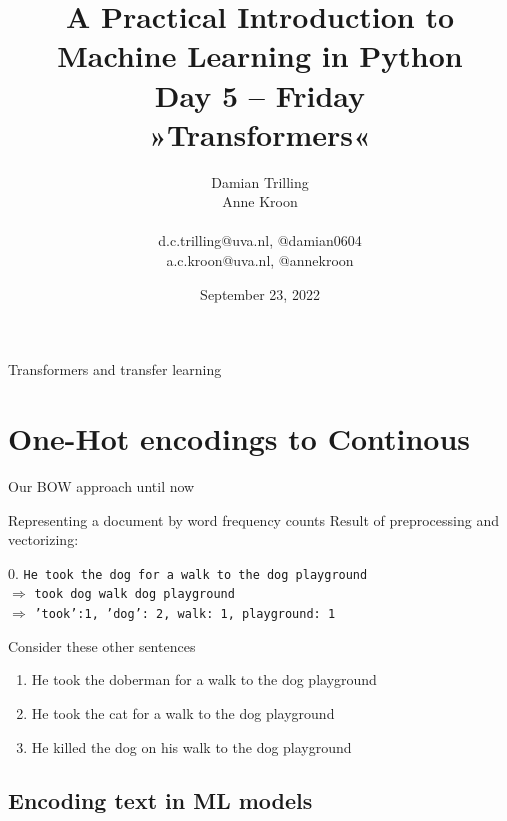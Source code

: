 \documentclass[compress]{beamer}
\title[ML in PYthon]{\textbf{A Practical Introduction to Machine Learning in Python} \\Day 5 -- Friday \\ »Transformers«}
\author[Damian Trilling, Anne Kroon]{Damian Trilling \\ Anne Kroon \\ ~ \\ \footnotesize{d.c.trilling@uva.nl, @damian0604 \\a.c.kroon@uva.nl, @annekroon} \\}
\date{September 23, 2022}
\institute[Gesis]{Gesis}
\begin{document}
\begin{frame}{}
	\titlepage
\end{frame}

\begin{frame}{Transformers and transfer learning}
	\begin{scriptsize}
\tableofcontents
\end{scriptsize}
\end{frame}


\section[One-Hot]{One-Hot encodings to Continous}

\begin{frame}{Our BOW approach until now}
	\begin{block}{Representing a document by word frequency counts}
		Result of preprocessing and vectorizing:
		
		0. \texttt{He took the dog for a walk to the dog playground}\\
		$\Rightarrow$ \texttt{took dog walk dog playground}\\
		$\Rightarrow$ \texttt{'took':1, 'dog': 2, walk: 1, playground: 1}
	\end{block}
	
	Consider these other sentences
	\begin{enumerate}
		\item<2-> He took the doberman for a walk to the dog playground
		\item<3-> He took the cat for a walk to the dog playground
		\item<4-> He killed the dog on his walk to the dog playground 
	\end{enumerate}
	
\end{frame}

\subsection{Encoding text in ML models}
\end{document}
